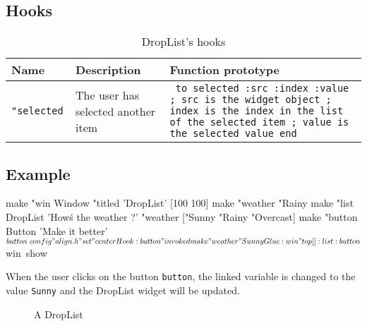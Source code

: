 \subsection{Hooks}

\begin{table}[h!]
\centering
\begin{tabular}{|l|p{3cm}|p{8.5cm}|}
\hline
\bf Name & \bf Description & \bf Function prototype \\
\hline
\tt "selected\index{DropList@\textbf{DropList}!Hooks!selected} & The user has selected another item & {\tt
to selected :src :index :value\newline
; src is the widget object\newline
; index is the index in the list of the selected item\newline
; value is the selected value
end
}\\
\hline
\end{tabular}
\caption{DropList's hooks}
\end{table}

\subsection{Example}

\begin{listing}{1}
make "win Window "titled 'DropList' [100 100]
make "weather "Rainy
make "list DropList 'How\'s the weather ?' "weather ["Sunny "Rainy "Overcast]
make "button Button 'Make it better'
$button~config "align.h "set "center
Hook :button "invoked {
	make "weather "Sunny	
}
Glue :win "top [] :list :button
$win~show
\end{listing}

When the user clicks on the button {\tt button}, the linked variable is changed to the value {\tt Sunny} and the DropList widget will be updated.

\begin{figure}[h!]
\centering
{}
\label{s33}
\caption{A DropList}
\end{figure}
